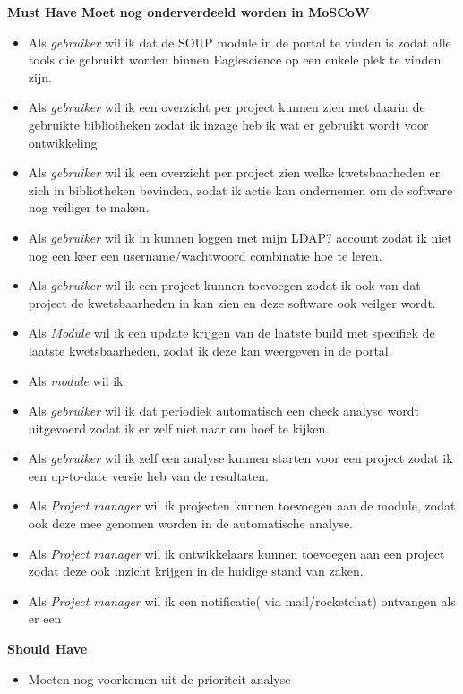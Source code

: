\textbf{Must Have Moet nog onderverdeeld worden in MoSCoW}
\begin{itemize}
  \item Als \textit{gebruiker} wil ik dat de SOUP module in de portal te vinden is zodat alle tools die gebruikt worden binnen Eaglescience op een enkele plek te vinden zijn.
  \item Als \textit{gebruiker} wil ik een overzicht per project kunnen zien met daarin de gebruikte bibliotheken zodat ik inzage heb ik wat er gebruikt wordt voor ontwikkeling.
  \item Als \textit{gebruiker} wil ik een overzicht per project zien welke kwetsbaarheden er zich in bibliotheken bevinden, zodat ik actie kan ondernemen om de software nog veiliger te maken.
  \item Als \textit{gebruiker} wil ik in kunnen loggen met mijn LDAP? account zodat ik niet nog een keer een username/wachtwoord combinatie hoe te leren.
  \item Als \textit{gebruiker} wil ik een project kunnen toevoegen zodat ik ook van dat project de kwetsbaarheden in kan zien en deze software ook veilger wordt.
  \item Als \textit{Module} wil ik een update krijgen van de laatste build met specifiek de laatste kwetsbaarheden, zodat ik deze kan weergeven in de portal.
  \item Als \textit{module} wil ik
  \item Als \textit{gebruiker} wil ik dat periodiek automatisch een check analyse wordt uitgevoerd zodat ik er zelf niet naar om hoef te kijken.
  \item Als \textit{gebruiker} wil ik zelf een analyse kunnen starten voor een project zodat ik een up-to-date versie heb van de resultaten.
  \item Als \textit{Project manager} wil ik projecten kunnen toevoegen aan de module, zodat ook deze mee genomen worden in de automatische analyse.
  \item Als \textit{Project manager} wil ik ontwikkelaars kunnen toevoegen aan een project zodat deze ook inzicht krijgen in de huidige stand van zaken.
  \item Als \textit{Project manager} wil ik een notificatie( via mail/rocketchat) ontvangen als er een
\end{itemize}

\textbf{Should Have}
\begin{itemize}
  \item Moeten nog voorkomen uit de prioriteit analyse
\end{itemize}

